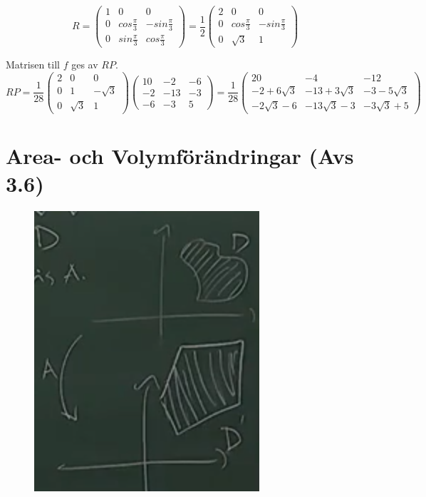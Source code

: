 \begin{equation*}
    R=\begin{pmatrix}
        1&0&0\\
        0&cos\frac{\pi}{3}&-sin\frac{\pi}{3}\\
        0&sin\frac{\pi}{3}&cos\frac{\pi}{3}
    \end{pmatrix}=
    \frac{1}{2}\begin{pmatrix}
        2&0&0\\
        0&cos\frac{\pi}{3}&-sin\frac{\pi}{3}\\
        0&\sqrt{3}&1
    \end{pmatrix}
\end{equation*}

Matrisen till $f$ ges av $RP$.\\
\begin{equation*}
    RP=\frac{1}{28}\begin{pmatrix}
        2&0&0\\
        0&1&-\sqrt{3}\\
        0&\sqrt{3}&1
    \end{pmatrix}\begin{pmatrix}
        10&-2&-6\\
        -2&-13&-3\\
        -6&-3&5
    \end{pmatrix}=
    \frac{1}{28}\begin{pmatrix}
        20&-4&-12\\
        -2+6\sqrt{3}&-13+3\sqrt{3}&-3-5\sqrt{3}\\
        -2\sqrt{3}-6&-13\sqrt{3}-3&-3\sqrt{3}+5
    \end{pmatrix}
\end{equation*}

\chapter{Area- och Volymförändringar (Avs 3.6)}
\begin{figure}
    \vspace{-50pt}
    \centering
    \includegraphics[scale=0.4]{imgs/img03.png}
    \vspace{-30pt}
\end{figure}
